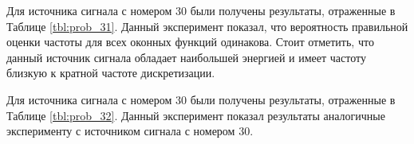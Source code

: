 Для источника сигнала с номером 30 были получены результаты, отраженные в Таблице \ref{tbl:prob_31}. Данный эксперимент показал, что вероятность правильной оценки частоты для
всех оконных функций одинакова. Стоит отметить, что данный источник сигнала обладает наибольшей энергией и имеет частоту близкую к кратной частоте дискретизации.

Для источника сигнала с номером 30 были получены результаты, отраженные в Таблице \ref{tbl:prob_32}. Данный эксперимент показал результаты аналогичные эксперименту с источником
сигнала с номером 30.

